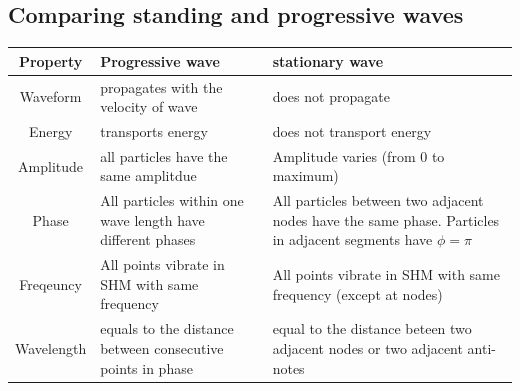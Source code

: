 \documentclass[a4paper, 10pt]{article}
\begin{document}
\subsection{Comparing standing and progressive waves}
\begin{center}
   \begin{tabular}{c | T | T}
      Property & Progressive wave & stationary wave \\
      \hline 
      Waveform & propagates with the velocity of wave & does not propagate \\ 
      \hline
      Energy & transports energy & does not transport energy \\
      \hline
      Amplitude & all particles have the same amplitdue & Amplitude varies (from 0 to maximum) \\
      \hline
      Phase & All particles within one wave length have different phases & All particles between two adjacent nodes have the same phase. Particles in adjacent segments have $\phi = \pi$ \\
      \hline
      Freqeuncy & All points vibrate in SHM with same frequency & All points vibrate in SHM with same frequency (except at nodes) \\
      \hline
      Wavelength & equals to the distance between consecutive points in phase & equal to the distance beteen two adjacent nodes or two adjacent anti-notes \\
      \hline

   \end{tabular}
\end{center}
\end{document}
